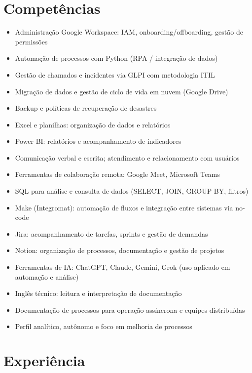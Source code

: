 \documentclass[11pt,a4paper]{article}
\begin{document}
\section{Competências}
\begin{itemize}
  \item Administração Google Workspace: IAM, onboarding/offboarding, gestão de permissões
  \item Automação de processos com Python (RPA / integração de dados)
  \item Gestão de chamados e incidentes via GLPI com metodologia ITIL
  \item Migração de dados e gestão de ciclo de vida em nuvem (Google Drive)
  \item Backup e políticas de recuperação de desastres
  \item Excel e planilhas: organização de dados e relatórios
  \item Power BI: relatórios e acompanhamento de indicadores
  \item Comunicação verbal e escrita; atendimento e relacionamento com usuários
  \item Ferramentas de colaboração remota: Google Meet, Microsoft Teams
  \item SQL para análise e consulta de dados (SELECT, JOIN, GROUP BY, filtros)
  \item Make (Integromat): automação de fluxos e integração entre sistemas via no-code
  \item Jira: acompanhamento de tarefas, sprints e gestão de demandas
  \item Notion: organização de processos, documentação e gestão de projetos
  \item Ferramentas de IA: ChatGPT, Claude, Gemini, Grok (uso aplicado em automação e análise)
  \item Inglês técnico: leitura e interpretação de documentação
  \item Documentação de processos para operação assíncrona e equipes distribuídas
  \item Perfil analítico, autônomo e foco em melhoria de processos
\end{itemize}

\section{Experiência}
\end{document}

